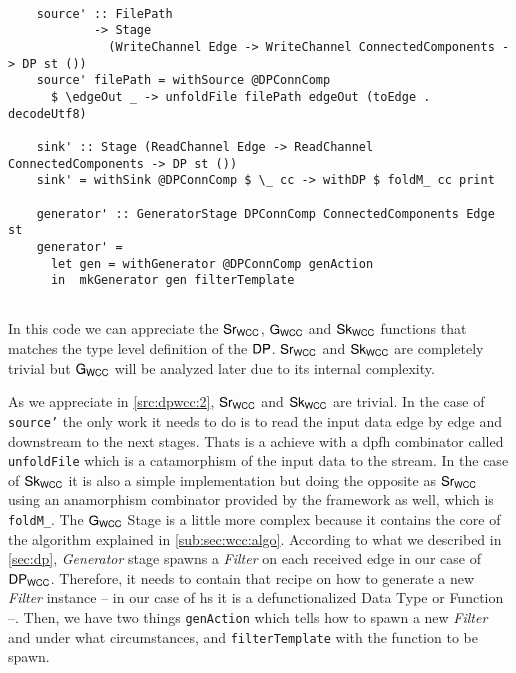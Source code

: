 \begin{listing}[H]
  \begin{verbatim}
    
    source' :: FilePath
            -> Stage
              (WriteChannel Edge -> WriteChannel ConnectedComponents -> DP st ())
    source' filePath = withSource @DPConnComp
      $ \edgeOut _ -> unfoldFile filePath edgeOut (toEdge . decodeUtf8)

    sink' :: Stage (ReadChannel Edge -> ReadChannel ConnectedComponents -> DP st ())
    sink' = withSink @DPConnComp $ \_ cc -> withDP $ foldM_ cc print

    generator' :: GeneratorStage DPConnComp ConnectedComponents Edge st
    generator' =
      let gen = withGenerator @DPConnComp genAction
      in  mkGenerator gen filterTemplate
        
  \end{verbatim}
  \caption[{[\texttt{ConnectedComp.hs}] $\iwc$, $\gwc$ $\owc$ Code}]{In this code we can appreciate the $\iwc$, $\gwc$ and $\owc$ functions that matches the type level definition of the $\DP$. $\iwc$ and $\owc$ are completely trivial but $\gwc$ will be analyzed later due to its internal complexity.}
  \label{src:dpwcc:2}
\end{listing}

As we appreciate in \autoref{src:dpwcc:2}, $\mathsf{Sr_{WCC}}$ and $\mathsf{Sk_{WCC}}$ are trivial. In the case of \texttt{source'} the only work it needs to do is to read the input data edge by edge and downstream to the next stages. 
Thats is a achieve with a \acrshort{dpfh} combinator called \texttt{unfoldFile} which is a catamorphism of the input data to the stream.
In the case of $\mathsf{Sk_{WCC}}$ it is also a simple implementation but doing the opposite as $\mathsf{Sr_{WCC}}$ using an anamorphism combinator provided by the framework as well, which is \texttt{foldM_}.
The $\mathsf{G_{WCC}}$ Stage is a little more complex because it contains the core of the algorithm explained in \autoref{sub:sec:wcc:algo}. According to what we described in \autoref{sec:dp}, \textit{Generator} stage spawns a \textit{Filter} on each received edge in our case of $\mathsf{DP_{WCC}}$.
Therefore, it needs to contain that recipe on how to generate a new \textit{Filter} instance -- in our case of \acrshort{hs} it is a defunctionalized Data Type or Function --. 
Then, we have two things \texttt{genAction} which tells how to spawn a new \textit{Filter} and under what circumstances, and \texttt{filterTemplate} with the function to be spawn.

